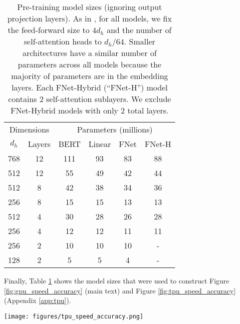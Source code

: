 \documentclass[11pt]{article}
\begin{document}
\begin{table}
    \caption{Pre-training model sizes (ignoring output projection layers). As in \citet{turc2019well}, for all models, we fix the feed-forward size to $4d_{h}$ and the number of self-attention heads to $d_{h}/64$. Smaller architectures have a similar number of parameters across all models because the majority of parameters are in the embedding layers. Each FNet-Hybrid (``FNet-H'') model contains 2 self-attention sublayers. We exclude FNet-Hybrid models with only 2 total layers.}
    \label{tab:model_sizes}
    \centering
    \setlength{\tabcolsep}{4pt}
    \begin{tabular}{c c | c c c c}
        \hline
        \multicolumn{2}{c|}{Dimensions} & \multicolumn{4}{c}{Parameters (millions)}  \\ 
        $d_{h}$ & Layers & BERT & Linear & FNet & FNet-H  \\
          \hline \hline
        768  & 12 & 111 & 93 & 83 & 88 \\
        512  & 12 & 55 & 49 & 42 & 44 \\
        512  & 8 & 42 & 38 & 34 & 36 \\
        256 & 8 & 15 & 15 & 13 & 13 \\
        512 & 4 & 30 & 28 & 26 & 28 \\
        256  & 4 & 12 & 12 & 11 & 11\\
        256 & 2 & 10 & 10 & 10 & - \\
        128 & 2 & 5 & 5 & 4 & - \\ \hline
    \end{tabular}
\end{table}

Finally, Table \ref{tab:model_sizes} shows the model sizes that were used to construct Figure \ref{fig:gpu_speed_accuracy} (main text) and Figure \ref{fig:tpu_speed_accuracy} (Appendix \ref{app:tpu}).


\begin{figure*}
    \centering
    \texttt{[image: figures/tpu\_speed\_accuracy.png]}
    \caption{Speed-accuracy trade-offs for TPU pre-training. The dashed line shows the Pareto efficiency frontier.}
    \label{fig:tpu_speed_accuracy}
\end{figure*}
\end{document}
